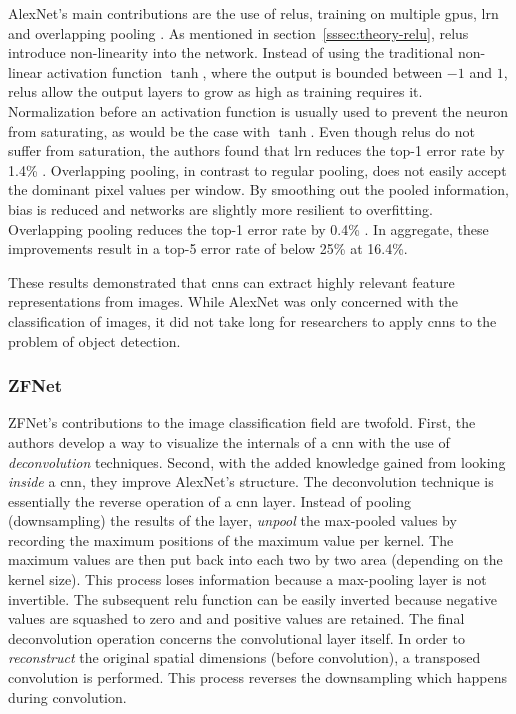 \documentclass[draft,final]{vutinfth} %
\begin{document}
AlexNet's main contributions are the use of \glspl{relu}, training on
multiple \glspl{gpu}, \gls{lrn} and overlapping pooling
\cite{krizhevsky2012}. As mentioned in
section~\ref{sssec:theory-relu}, \glspl{relu} introduce non-linearity
into the network. Instead of using the traditional non-linear
activation function $\tanh$, where the output is bounded between $-1$
and $1$, \glspl{relu} allow the output layers to grow as high as
training requires it. Normalization before an activation function is
usually used to prevent the neuron from saturating, as would be the
case with $\tanh$. Even though \glspl{relu} do not suffer from
saturation, the authors found that \gls{lrn} reduces the top-1 error
rate by 1.4\% \cite{krizhevsky2012}. Overlapping pooling, in contrast
to regular pooling, does not easily accept the dominant pixel values
per window. By smoothing out the pooled information, bias is reduced
and networks are slightly more resilient to overfitting. Overlapping
pooling reduces the top-1 error rate by 0.4\%
\cite{krizhevsky2012}. In aggregate, these improvements result in a
top-5 error rate of below 25\% at 16.4\%.

These results demonstrated that \glspl{cnn} can extract highly
relevant feature representations from images. While AlexNet was only
concerned with the classification of images, it did not take long for
researchers to apply \glspl{cnn} to the problem of object detection.

\subsubsection{ZFNet}
\label{sssec:theory-zfnet}

ZFNet's \cite{zeiler2014} contributions to the image classification
field are twofold. First, the authors develop a way to visualize the
internals of a \gls{cnn} with the use of \emph{deconvolution}
techniques. Second, with the added knowledge gained from looking
\emph{inside} a \gls{cnn}, they improve AlexNet's structure. The
deconvolution technique is essentially the reverse operation of a
\gls{cnn} layer. Instead of pooling (downsampling) the results of the
layer, \textcite{zeiler2014} \emph{unpool} the max-pooled values by
recording the maximum positions of the maximum value per kernel. The
maximum values are then put back into each two by two area (depending
on the kernel size). This process loses information because a
max-pooling layer is not invertible. The subsequent \gls{relu}
function can be easily inverted because negative values are squashed
to zero and and positive values are retained. The final deconvolution
operation concerns the convolutional layer itself. In order to
\emph{reconstruct} the original spatial dimensions (before
convolution), a transposed convolution is performed. This process
reverses the downsampling which happens during convolution.
\end{document}
